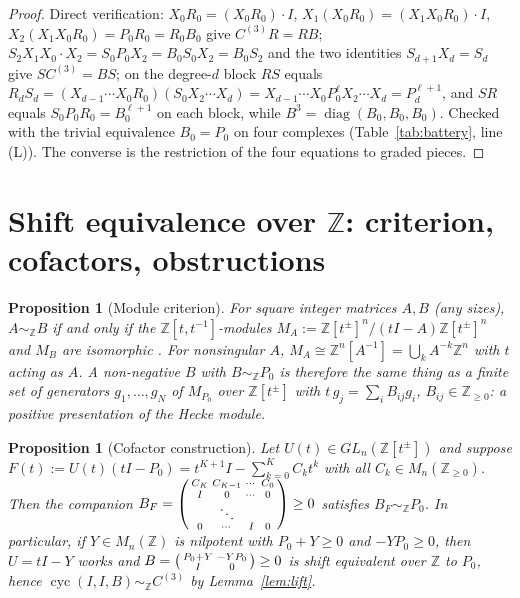 \documentclass[11pt]{amsart}
\numberwithin{equation}{section}
\newtheorem{proposition}[theorem]{Proposition}
\theoremstyle{definition}
\theoremstyle{remark}
\newcommand{\Z}{\mathbb{Z}}
\newcommand{\Cthree}{C^{(3)}}
\newcommand{\SE}{\sim_{\Z}}
\begin{document}
\begin{proof}
Direct verification: $X_0R_0=(X_0R_0)\cdot I$, $X_1(X_0R_0)=(X_1X_0R_0)\cdot I$,
$X_2(X_1X_0R_0)=P_0R_0=R_0B_0$ give $\Cthree R=RB$; $S_2X_1X_0\cdot X_2=S_0P_0X_2=B_0S_0X_2=
B_0S_2$ and the two identities $S_{d+1}X_d=S_d$ give $S\Cthree=BS$; on the degree-$d$ block
$RS$ equals $R_dS_d=(X_{d-1}\cdots X_0R_0)(S_0X_2\cdots X_d)=X_{d-1}\cdots X_0P_0^{\ell}X_2
\cdots X_d=P_d^{\ell+1}$, and $SR$ equals $S_0P_0R_0=B_0^{\ell+1}$ on each block, while
$B^{3}=\operatorname{diag}(B_0,B_0,B_0)$. Checked with the trivial equivalence
$B_0=P_0$ on four complexes (Table~\ref{tab:battery}, line (L)). The converse is the
restriction of the four equations to graded pieces.
\end{proof}

\section{Shift equivalence over \texorpdfstring{$\Z$}{Z}: criterion, cofactors, obstructions}\label{sec:se}

\begin{proposition}[Module criterion]\label{prop:module}
For square integer matrices $A,B$ (any sizes), $A\SE B$ if and only if the $\Z[t,t^{-1}]$-modules
$M_A:=\Z[t^{\pm}]^{n}/(tI-A)\Z[t^{\pm}]^{n}$ and $M_B$ are isomorphic \cite[\S2]{BS}. For
nonsingular $A$, $M_A\cong\Z^{n}[A^{-1}]=\bigcup_kA^{-k}\Z^{n}$ with $t$ acting as $A$. A
non-negative $B$ with $B\SE P_0$ is therefore the same thing as a finite set of generators
$g_1,\dots,g_N$ of $M_{P_0}$ over $\Z[t^{\pm}]$ with $t\,g_j=\sum_iB_{ij}g_i$, $B_{ij}\in
\Z_{\ge0}$: a \emph{positive presentation} of the Hecke module.
\end{proposition}

\begin{proposition}[Cofactor construction]\label{prop:cofactor}
Let $U(t)\in GL_n(\Z[t^{\pm}])$ and suppose $F(t):=U(t)(tI-P_0)=t^{K+1}I-\sum_{k=0}^{K}C_kt^{k}$
with all $C_k\in M_n(\Z_{\ge0})$. Then the companion
$B_F=\begin{psmallmatrix}C_K&C_{K-1}&\cdots&C_0\\ I&0&\cdots&0\\ &\ddots&&\\ 0&\cdots&I&0
\end{psmallmatrix}\ge0$ satisfies $B_F\SE P_0$. In particular, if $Y\in M_n(\Z)$ is
nilpotent with $P_0+Y\ge0$ and $-YP_0\ge0$, then $U=tI-Y$ works and
$B=\begin{psmallmatrix}P_0+Y&-YP_0\\ I&0\end{psmallmatrix}\ge0$ is shift equivalent over
$\Z$ to $P_0$, hence $\operatorname{cyc}(I,I,B)\SE\Cthree$ by Lemma~\ref{lem:lift}.
\end{proposition}
\end{document}
